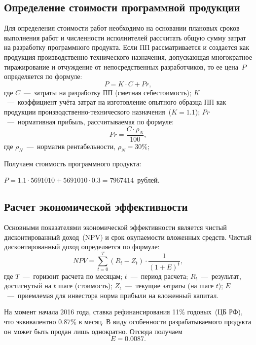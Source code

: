    \subsection{Определение стоимости программной продукции}
        Для определения стоимости работ необходимо на основании плановых сроков выполнения работ и численности исполнителей рассчитать общую сумму затрат на разработку программного продукта.
        Если ПП рассматривается и создается как продукция производственно-технического назначения,
        допускающая многократное тиражирование и отчуждение от непосредственных разработчиков, то ее цена~$P$ определяется по формуле:
        \begin{equation}
            P = K \cdot C+Pr,
        \end{equation}
        где $C$~---~затраты на разработку ПП (сметная себестоимость);
        $K$~---~коэффициент учёта затрат на изготовление опытного образца ПП как продукции производственно-технического назначения~($K=1.1$);
        $Pr$~---~нормативная прибыль, рассчитываемая по формуле:
        \begin{equation}
            Pr= \frac {C  \cdot  \rho_N} {100},
        \end{equation}
        где $\rho_N$~---~норматив рентабельности, $\rho_N=30\%$;

        Получаем стоимость программного продукта:

        {\centering$P=1.1 \cdot 5691010 + 5691010 \cdot 0.3=7967414$~рублей.

        }
    \subsection{Расчет экономической эффективности}
        Основными показателями экономической эффективности является чистый дисконтированный доход~(NPV) и срок окупаемости вложенных средств.
        Чистый дисконтированный доход определяется по формуле:
        \begin{equation}
            NPV=\sum_{t=0}^T (R_t-Z_t) \cdot \dfrac{1}{(1+E)^t},
        \end{equation}
        где $T$~---~горизонт расчета по месяцам;
        $t$~---~период расчета;
        $R_t$~---~результат, достигнутый на $t$ шаге (стоимость);
        $Z_t$~---~текущие затраты (на шаге $t$);
        $E$~---~приемлемая для инвестора норма прибыли на вложенный капитал.

        На момент начала 2016 года, ставка рефинансирования 11\% годовых~(ЦБ РФ), что эквивалентно 0.87\% в месяц. В виду особенности разрабатываемого продукта он может быть продан лишь однократно.
        Отсюда получаем $$E=0.0087.$$

